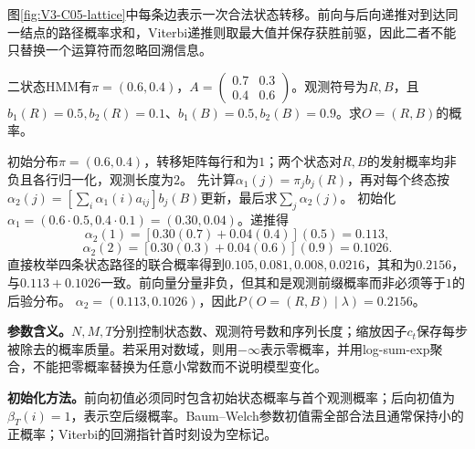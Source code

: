 \label{struct:V3-C05-CH17}

图\ref{fig:V3-C05-lattice}中每条边表示一次合法状态转移。前向与后向递推对到达同一结点的路径概率求和，Viterbi递推则取最大值并保存获胜前驱，因此二者不能只替换一个运算符而忽略回溯信息。

\label{struct:V3-C05-CH18}
\begin{example}[两状态HMM的前向概率]\label{exm:V3-C05-viterbi-numeric}
二状态HMM有$\pi=(0.6,0.4)$，$A=\begin{pmatrix}0.7&0.3\\0.4&0.6\end{pmatrix}$。观测符号为$R,B$，且$b_1(R)=0.5,b_2(R)=0.1$、$b_1(B)=0.5,b_2(B)=0.9$。求$O=(R,B)$的概率。
\end{example}
\begin{solution}
\SolGiven 初始分布$\pi=(0.6,0.4)$，转移矩阵每行和为$1$；两个状态对$R,B$的发射概率均非负且各行归一化，观测长度为$2$。
\SolPlan 先计算$\alpha_1(j)=\pi_jb_j(R)$，再对每个终态按$\alpha_2(j)=[\sum_i\alpha_1(i)a_{ij}]b_j(B)$更新，最后求$\sum_j\alpha_2(j)$。
\SolDerive
初始化$\alpha_1=(0.6\cdot0.5,0.4\cdot0.1)=(0.30,0.04)$。递推得
\[
\alpha_2(1)=[0.30(0.7)+0.04(0.4)](0.5)=0.113,
\]
\[
\alpha_2(2)=[0.30(0.3)+0.04(0.6)](0.9)=0.1026.
\]
\SolCheck 直接枚举四条状态路径的联合概率得到$0.105,0.081,0.008,0.0216$，其和为$0.2156$，与$0.113+0.1026$一致。前向量分量非负，但其和是观测前缀概率而非必须等于$1$的后验分布。
\SolAnswer $\alpha_2=(0.113,0.1026)$，因此$P(O=(R,B)\mid\lambda)=0.2156$。
\end{solution}

\label{struct:V3-C05-CH19}
\label{struct:V3-C05-CH20}
\label{struct:V3-C05-CH21}
\textbf{参数含义。}$N,M,T$分别控制状态数、观测符号数和序列长度；缩放因子$c_t$保存每步被除去的概率质量。若采用对数域，则用$-\infty$表示零概率，并用log-sum-exp聚合，不能把零概率替换为任意小常数而不说明模型变化。

\label{struct:V3-C05-CH22}
\textbf{初始化方法。}前向初值必须同时包含初始状态概率与首个观测概率；后向初值为$\beta_T(i)=1$，表示空后缀概率。Baum--Welch参数初值需全部合法且通常保持小的正概率；Viterbi的回溯指针首时刻设为空标记。

